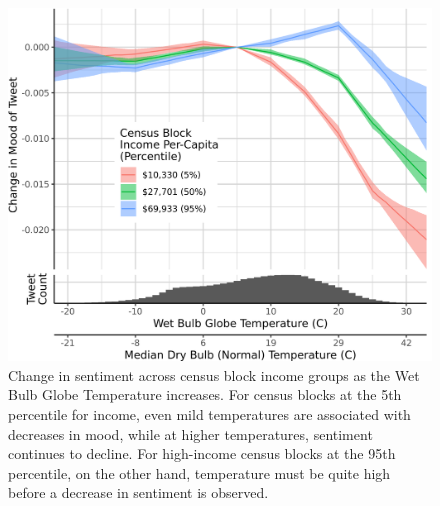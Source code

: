\documentclass{article}
\begin{document}
\begin{figure}[H]
  \centering
  \includegraphics[width=\linewidth]{../res/wbgt-income.png}
  \caption{Change in sentiment across census block income groups as the Wet Bulb Globe Temperature increases.  For census blocks at the 5th percentile for income, even mild temperatures are associated with decreases in mood, while at higher temperatures, sentiment continues to decline.  For high-income census blocks at the 95th percentile, on the other hand, temperature must be quite high before a decrease in sentiment is observed.}
  \label{fig:wbgt-income}
\end{figure}
\end{document}
